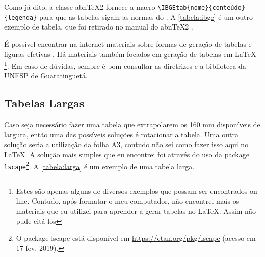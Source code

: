 \documentclass[
  12pt,		%
  a4paper,	%
  openright,%
  oneside,	%
  chapter=TITLE,		%
  section=TITLE,		%
  english,	%
  french,	%
  spanish,	%
  brazil
]{abntex2}
\begin{document}
                Como já dito, a classe abn\TeX2 fornece a macro \verb|\IBGEtab{nome}{conteúdo}| \verb|{legenda}| para que as tabelas sigam as normas do \cite{ibge1993}. A \autoref{tabela:ibge} é um outro exemplo de tabela, que foi retirado no manual do abn\TeX2 \cite{abntex2classe}.
                
                \begin{table}[htb]
                    \end{table}
                 
                 
                  É possível encontrar na internet materiais sobre formas de geração de tabelas e figuras efetivas \cite{effective_tables_figures}. Há materiais também focados em geração de tabelas em \LaTeX{}  \cite{table_latex} \footnote{Estes são apenas alguns de diversos exemplos que possam ser encontrados on-line. Contudo, após formatar o meu computador, não encontrei mais os materiais que eu utilizei para aprender a gerar tabelas no LaTeX. Assim não pude citá-los}. Em caso de dúvidas, sempre é bom consultar as diretrizes e a biblioteca da UNESP de Guaratinguetá. 
                  
             \subsection {Tabelas Largas}
             \label{chapter:exemplos:tabelas_larga}
             
             Caso seja necessário fazer uma tabela que extrapolarem os 160 mm disponíveis de largura, então uma das possíveis soluções é rotacionar a tabela.  Uma outra solução seria a utilização da folha A3, contudo não sei como fazer isso aqui no \LaTeX. A solução mais simples que eu encontrei foi através do uso da package \verb|lscape|\footnote{O package lscape está disponível em \url{https://ctan.org/pkg/lscape} (acesso em 17 fev. 2019).}. A \autoref{tabela:larga} é um exemplo de uma tabela larga.
             
\end{document}
